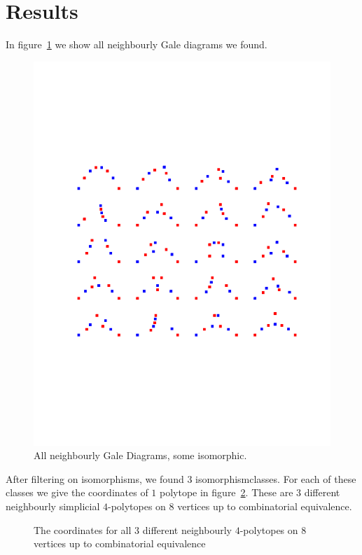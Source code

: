 \documentclass[paper=a4, fontsize=11pt]{scrartcl} %
\theoremstyle{definition}
\begin{document}
\section{Results}
In figure~\ref{fig:gale} we show all neighbourly Gale diagrams we found.
\begin{figure}[!htb]
\centering
\includegraphics[trim={0 5cm 0 5cm},clip,width=\textwidth]{gale_diagrams.pdf}
\caption{All neighbourly Gale Diagrams, some isomorphic.}
\label{fig:gale}
\end{figure}


After filtering on isomorphisms, we found $3$ isomorphismclasses. For each of these classes we give the coordinates of $1$ polytope in figure~\ref{fig:polyPoints}. These are $3$ different neighbourly simplicial $4$-polytopes on $8$ vertices up to combinatorial equivalence.

\begin{figure}[!htb]

\caption{The coordinates for all $3$ different neighbourly $4$-polytopes on $8$ vertices up to combinatorial equivalence}
\label{fig:polyPoints}
\end{figure}
\end{document}
